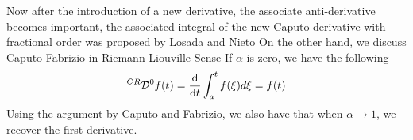 \documentclass[twoside]{book}
\begin{document}
{Now after the introduction of a new derivative, the associate anti-derivative becomes important, the associated integral of the new Caputo derivative with fractional order was proposed by Losada and Nieto
On the other hand, we discuss Caputo-Fabrizio in Riemann-Liouville Sense
If $\alpha$ is zero, we have the following
$$^{CR}\mathcal{D}^{0} f(t) = \dv{}{t} \int_a^t f(\xi) d\xi = f(t)$$
Using the argument by Caputo and Fabrizio, we also have that when $\alpha \rightarrow 1$, we recover the first derivative.

}
\end{document}
